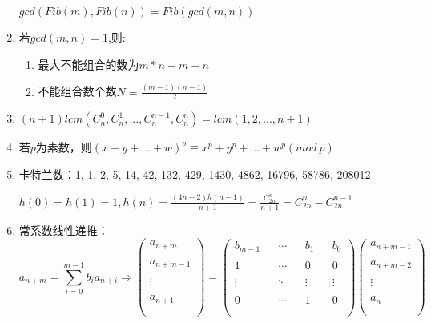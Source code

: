 \documentclass[twoside]{article}
\begin{document}
\begin{enumerate}
$gcd(Fib(m),Fib(n))=Fib(gcd(m,n))$

\item 若$gcd(m,n)=1$,则:

\begin{enumerate}
\item 最大不能组合的数为$m*n-m-n$
\item 不能组合数个数$N=\frac{(m-1)(n-1)}{2}$
\end{enumerate}

\item $(n+1)lcm(C_n^0,C_n^1,...,C_n^{n-1},C_n^{n})=lcm(1,2,...,n+1)$

\item 若$p$为素数，则$(x+y+...+w)^p\equiv x^p+y^p+...+w^p(mod\ p)$

\item 卡特兰数：1, 1, 2, 5, 14, 42, 132, 429, 1430, 4862, 16796, 58786, 208012

$h(0)=h(1)=1,h(n)=\frac{(4n-2)h(n-1)}{n+1}=\frac{C_{2n}^n}{n+1}=C_{2n}^n-C_{2n}^{n-1}$

\item 常系数线性递推：
$$
a_{n+m}=\sum_{i=0}^{m-1}b_ia_{n+i}\Rightarrow
\left(
\begin{matrix}
 a_{n+m}    \\\\
 a_{n+m-1}  \\\\
 \vdots     \\\\
 a_{n+1}    \\\\
\end{matrix}
\right)
=
\left(
\begin{matrix}
 b_{m-1} && \cdots && b_1    && b_0    \\\\
 1       && \cdots && 0      && 0      \\\\
 \vdots  && \ddots && \vdots && \vdots \\\\
 0       && \cdots && 1      && 0      \\\\
\end{matrix}
\right)
\left(
\begin{matrix}
 a_{n+m-1} \\\\
 a_{n+m-2} \\\\
 \vdots    \\\\
 a_n       \\\\
\end{matrix}
\right)
$$


\end{enumerate}
\end{document}
